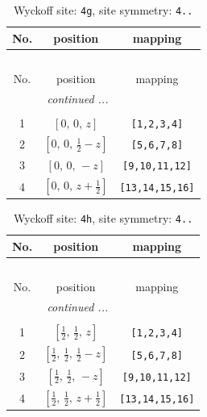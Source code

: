 \documentclass[fleqn,8pt]{jsarticle}
\begin{document}
\renewcommand{\arraystretch}{1.2}
\begin{longtable}{ccc}
\caption{Wyckoff site: {\tt 4g}, site symmetry: {\tt 4..}}
 \\
 \hline \hline
No. & position & mapping \\ \hline \endfirsthead

\multicolumn{2}{l}{\tablename\ \thetable{}} \\
 \hline \hline
No. & position & mapping \\ \hline \endhead

 \hline \hline
\multicolumn{2}{r}{\footnotesize\it continued ...} \\ \endfoot

 \hline \hline
\multicolumn{2}{r}{} \\ \endlastfoot

1 & $\left[ 0,\, 0,\, z \right]$ & {\tt [1,2,3,4]} \\ \hline
2 & $\left[ 0,\, 0,\, \frac{1}{2} - z \right]$ & {\tt [5,6,7,8]} \\ \hline
3 & $\left[ 0,\, 0,\, - z \right]$ & {\tt [9,10,11,12]} \\ \hline
4 & $\left[ 0,\, 0,\, z + \frac{1}{2} \right]$ & {\tt [13,14,15,16]} \\
\end{longtable}
\renewcommand{\arraystretch}{1.2}
\begin{longtable}{ccc}
\caption{Wyckoff site: {\tt 4h}, site symmetry: {\tt 4..}}
 \\
 \hline \hline
No. & position & mapping \\ \hline \endfirsthead

\multicolumn{2}{l}{\tablename\ \thetable{}} \\
 \hline \hline
No. & position & mapping \\ \hline \endhead

 \hline \hline
\multicolumn{2}{r}{\footnotesize\it continued ...} \\ \endfoot

 \hline \hline
\multicolumn{2}{r}{} \\ \endlastfoot

1 & $\left[ \frac{1}{2},\, \frac{1}{2},\, z \right]$ & {\tt [1,2,3,4]} \\ \hline
2 & $\left[ \frac{1}{2},\, \frac{1}{2},\, \frac{1}{2} - z \right]$ & {\tt [5,6,7,8]} \\ \hline
3 & $\left[ \frac{1}{2},\, \frac{1}{2},\, - z \right]$ & {\tt [9,10,11,12]} \\ \hline
4 & $\left[ \frac{1}{2},\, \frac{1}{2},\, z + \frac{1}{2} \right]$ & {\tt [13,14,15,16]} \\
\end{longtable}
\end{document}

